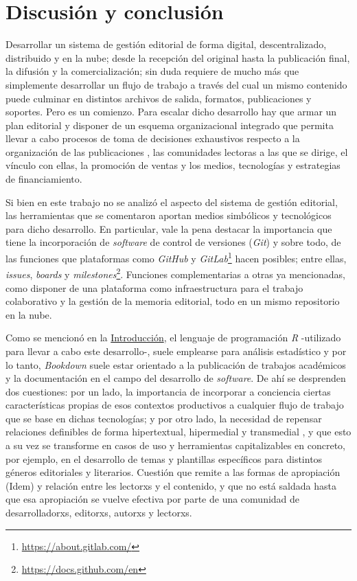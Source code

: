 \documentclass[
]{krantz}
\DeclareRobustCommand{\href}[2]{#2\footnote{\url{#1}}}
\begin{document}
\hypertarget{discusiuxf3n-y-conclusiuxf3n}{%
\chapter{Discusión y conclusión}\label{discusiuxf3n-y-conclusiuxf3n}}

Desarrollar un sistema de gestión editorial de forma digital, descentralizado, distribuido y en la nube; desde la recepción del original hasta la publicación final, la difusión y la comercialización; sin duda requiere de mucho más que simplemente desarrollar un flujo de trabajo a través del cual un mismo contenido puede culminar en distintos archivos de salida, formatos, publicaciones y soportes. Pero es un comienzo. Para escalar dicho desarrollo hay que armar un plan editorial y disponer de un esquema organizacional integrado que permita llevar a cabo procesos de toma de decisiones exhaustivos respecto a la organización de las publicaciones \citep{seminariopublicacionesdigitalesUnidadParte}, las comunidades lectoras a las que se dirige, el vínculo con ellas, la promoción de ventas y los medios, tecnologías y estrategias de financiamiento.

Si bien en este trabajo no se analizó el aspecto del sistema de gestión editorial, las herramientas que se comentaron aportan medios simbólicos y tecnológicos para dicho desarrollo. En particular, vale la pena destacar la importancia que tiene la incorporación de \emph{software} de control de versiones (\emph{Git}) y sobre todo, de las funciones que plataformas como \emph{GitHub} y \href{https://about.gitlab.com/}{\emph{GitLab}} hacen posibles; entre ellas, \href{https://docs.github.com/en}{\emph{issues}, \emph{boards} y \emph{milestones}}. Funciones complementarias a otras ya mencionadas, como disponer de una plataforma como infraestructura para el trabajo colaborativo y la gestión de la memoria editorial, todo en un mismo repositorio en la nube.

Como se mencionó en la \protect\hyperlink{intro}{Introducción}, el lenguaje de programación \emph{R} -utilizado para llevar a cabo este desarrollo-, suele emplearse para análisis estadístico y por lo tanto, \emph{Bookdown} suele estar orientado a la publicación de trabajos académicos y la documentación en el campo del desarrollo de \emph{software}. De ahí se desprenden dos cuestiones: por un lado, la importancia de incorporar a conciencia ciertas características propias de esos contextos productivos a cualquier flujo de trabajo que se base en dichas tecnologías; y por otro lado, la necesidad de repensar relaciones definibles de forma hipertextual, hipermedial y transmedial \citep{seminariopublicacionesdigitalesUnidadParte2021}, y que esto a su vez se transforme en casos de uso y herramientas capitalizables en concreto, por ejemplo, en el desarrollo de temas y plantillas específicos para distintos géneros editoriales y literarios. Cuestión que remite a las formas de apropiación (Idem) y relación entre les lectorxs y el contenido, y que no está saldada hasta que esa apropiación se vuelve efectiva por parte de una comunidad de desarrolladorxs, editorxs, autorxs y lectorxs.
\end{document}
